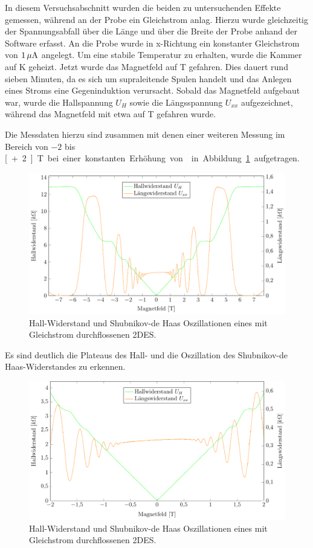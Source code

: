 
In diesem Versuchsabschnitt wurden die beiden zu untersuchenden Effekte gemessen, während an der Probe ein Gleichstrom anlag. Hierzu wurde gleichzeitig der Spannungsabfall über die Länge und über die Breite der Probe anhand der Software erfasst. An die Probe wurde in x-Richtung ein konstanter Gleichstrom von $\unit[1]{\mu A}$ angelegt. Um eine stabile Temperatur zu erhalten, wurde die Kammer auf \unit[2]{K} geheizt. Jetzt wurde das Magnetfeld auf \unit[-7]{T} gefahren. Dies dauert rund sieben Minuten, da es sich um supraleitende Spulen handelt und das Anlegen eines Stroms eine Gegeninduktion verursacht. Sobald das Magnetfeld aufgebaut war, wurde die Hallspannung $U_H$ sowie die Längsspannung $U_{xx}$ aufgezeichnet, während das Magnetfeld mit etwa  auf \unit[7]{T} gefahren wurde. 


Die Messdaten hierzu sind zusammen mit denen einer weiteren Messung im Bereich von $-2$ bis \unit[+2]{T} bei einer konstanten Erhöhung von  in Abbildung~\ref{fig:full_range_dc} aufgetragen.

\begin{figure}[h]
	\centering
	\includegraphics{graphs/dc/full_range.pdf}
	\caption[Gleichstrommessung im maximalen Magnetfeldbereich]{
		Hall-Widerstand und Shubnikov-de Haas Oszillationen eines mit Gleichstrom durchflossenen 2DES.
	}
	\label{fig:full_range_dc}
\end{figure}

Es sind deutlich die Plateaus des Hall- und die Oszillation des Shubnikov-de Haas-Widerstandes zu erkennen.


\begin{figure}[h]
	\centering
	\includegraphics{graphs/dc/pm2T_range.pdf}
	\caption[Höher aufgelöste Gleichstrommessung in Magnetfeldteilbereich]{
		Hall-Widerstand und Shubnikov-de Haas Oszillationen eines mit Gleichstrom durchflossenen 2DES.
	}
	\label{fig:2T_range_dc}
\end{figure}